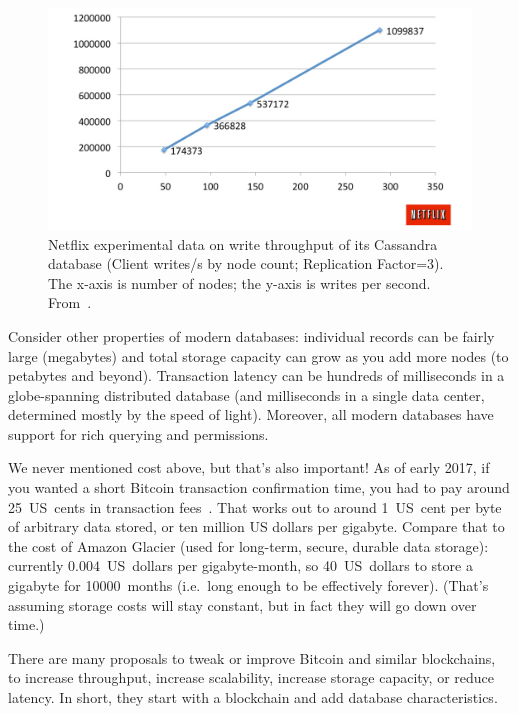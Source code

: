 \documentclass[a4paper]{article}
\begin{document}
\begin{figure}[!ht]
  \centering
  \includegraphics[width=\textwidth]{figure_2.pdf}
  \caption{Netflix experimental data on write throughput of its Cassandra database (Client writes/s by node count; Replication Factor=$3$).
  The x-axis is number of nodes; the y-axis is writes per second.
  From~\cite{cockcroft2011benchmarking}.}
  \label{fig:cassandra_throughput}
\end{figure}


Consider other properties of modern databases:
individual records can be fairly large (megabytes)
and total storage capacity can grow as you add more nodes
(to petabytes and beyond).
Transaction latency can be hundreds of milliseconds
in a globe-spanning distributed database
(and milliseconds in a single data center,
determined mostly by the speed of light).
Moreover, all modern databases have support
for rich querying and permissions.

We never mentioned cost above, but that's also important!
As of early 2017,
if you wanted a short Bitcoin transaction confirmation time,
you had to pay around 25~US~cents
in transaction fees~\cite{bitcoin_tx_fees_2017}.
That works out to around 1~US~cent
per byte of arbitrary data stored,
or ten million US dollars per gigabyte.
Compare that to the cost of Amazon Glacier (used
for long-term, secure, durable data storage):
currently $0.004$~US~dollars per gigabyte-month,
so 40~US~dollars to store a gigabyte for 10000~months
(i.e.~long enough to be effectively forever).
(That's assuming storage costs will stay constant,
but in fact they will go down over time.)

There are many proposals to tweak or improve Bitcoin and similar blockchains,
to increase throughput, increase scalability, increase storage capacity, or reduce latency.
In short, they start with a blockchain and add database characteristics.
\end{document}
